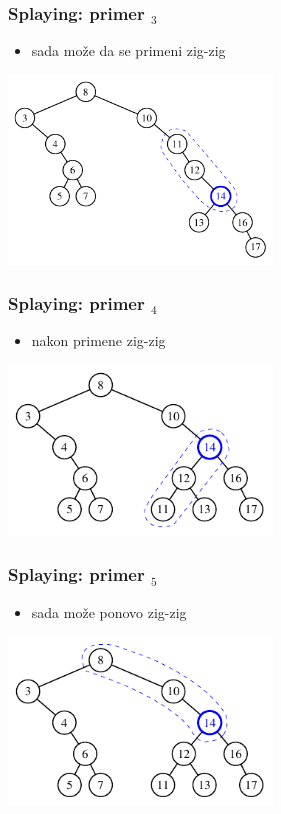 \documentclass[compress,aspectratio=169]{beamer}
\begin{document}
\begin{frame}[fragile]
  \frametitle{Splaying: primer $_3$}
  \begin{itemize}
    \item sada može da se primeni zig-zig
  \end{itemize}
  \begin{center}
    \includegraphics[width=7cm]{asp-11-pic23.pdf}
  \end{center}
\end{frame}

\begin{frame}[fragile]
  \frametitle{Splaying: primer $_4$}
  \begin{itemize}
    \item nakon primene zig-zig
  \end{itemize}
  \begin{center}
    \includegraphics[width=7cm]{asp-11-pic24.pdf}
  \end{center}
\end{frame}

\begin{frame}[fragile]
  \frametitle{Splaying: primer $_5$}
  \begin{itemize}
    \item sada može ponovo zig-zig
  \end{itemize}
  \begin{center}
    \includegraphics[width=7cm]{asp-11-pic25.pdf}
  \end{center}
\end{frame}
\end{document}
